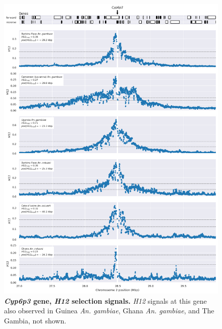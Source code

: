 \documentclass[a4paper,11pt,abstracton,hidelinks]{scrartcl}
\begin{document}
\begin{figure}[t!]
	\begin{center}
		\includegraphics*[width=1.1\linewidth,center]{artwork/locus_cyp6p3_h12.png}
	\end{center}
	\caption[\textit{Cyp6p3} gene, \textit{H12} selection signals]{
	\textbf{\textit{Cyp6p3} gene, \textit{H12} selection signals.}
	\textit{H12} signals at this gene also observed in Guinea \textit{An. gambiae}, Ghana \textit{An. gambiae}, and The Gambia, not shown. 
	} 
	\label{fig:locus_cyp6p3_h12}
\end{figure}


\clearpage
\end{document}

